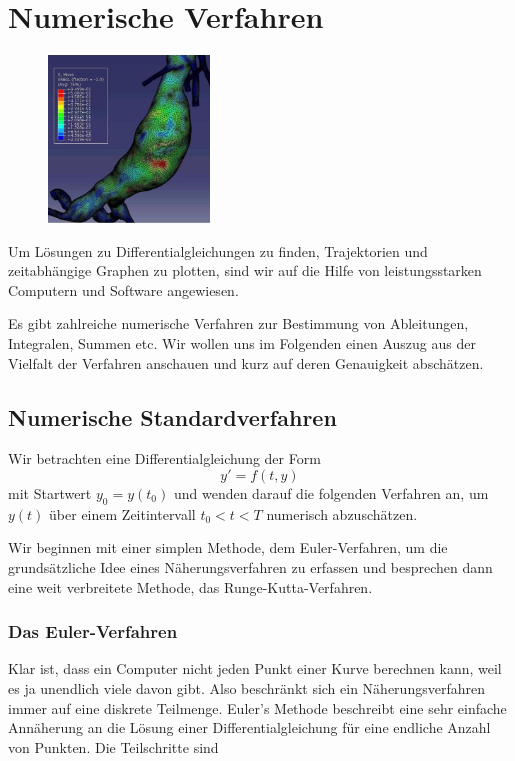 \documentclass[%
11pt,%
twoside,%
titlepage,%
swissgerman,%
headsepline%
]{scrartcl}
\theoremstyle{definition}
\theoremstyle{plain}
\begin{document}
\clearpage

\section{Numerische Verfahren}
\begin{figure}
  \begin{center}
    \includegraphics[width=0.382\textwidth]{pictures/aneurysma}
  \end{center}
\end{figure}
Um Lösungen zu Differentialgleichungen zu finden, Trajektorien und zeitabhängige Graphen zu plotten, sind wir auf die Hilfe von leistungsstarken Computern und Software angewiesen.

Es gibt zahlreiche numerische Verfahren zur Bestimmung von Ableitungen, Integralen, Summen etc. Wir wollen uns im Folgenden einen Auszug aus der Vielfalt der Verfahren anschauen und kurz auf deren Genauigkeit abschätzen.

\subsection{Numerische Standardverfahren}

Wir betrachten eine Differentialgleichung der Form
$$y'=f(t,y)$$
mit Startwert $y_0=y(t_0)$ und wenden darauf die folgenden Verfahren an, um $y(t)$ über einem Zeitintervall $t_0<t<T$ numerisch abzuschätzen.

Wir beginnen mit einer simplen Methode, dem Euler-Verfahren, um die grundsätzliche Idee eines Näherungsverfahren zu erfassen und besprechen dann eine weit verbreitete Methode, das Runge-Kutta-Verfahren.

\subsubsection{Das Euler-Verfahren}

Klar ist, dass ein Computer nicht jeden Punkt einer Kurve berechnen kann, weil es ja unendlich viele davon gibt. Also beschränkt sich ein Näherungsverfahren immer auf eine diskrete Teilmenge. Euler's Methode beschreibt eine sehr einfache Annäherung an die Lösung einer Differentialgleichung für eine endliche Anzahl von Punkten. Die Teilschritte sind
\end{document}
